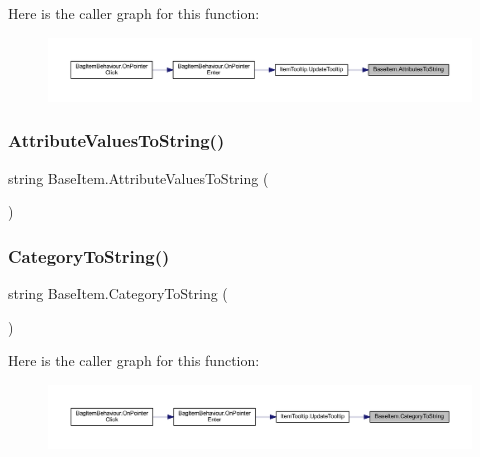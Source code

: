 Here is the caller graph for this function\+:\nopagebreak
\begin{figure}[H]
\begin{center}
\leavevmode
\includegraphics[width=350pt]{class_base_item_afd59d6b5168af724211f54ad3692ea73_icgraph}
\end{center}
\end{figure}
\mbox{\label{class_base_item_a414dcba1b98b9d67f2254b885049bfca}} 
\subsubsection{\texorpdfstring{AttributeValuesToString()}{AttributeValuesToString()}}
{\footnotesize\ttfamily string Base\+Item.\+Attribute\+Values\+To\+String (\begin{DoxyParamCaption}{ }\end{DoxyParamCaption})}

\mbox{\label{class_base_item_ad820521a001d82fc3f52b2483226efde}} 
\subsubsection{\texorpdfstring{CategoryToString()}{CategoryToString()}}
{\footnotesize\ttfamily string Base\+Item.\+Category\+To\+String (\begin{DoxyParamCaption}{ }\end{DoxyParamCaption})}

Here is the caller graph for this function\+:\nopagebreak
\begin{figure}[H]
\begin{center}
\leavevmode
\includegraphics[width=350pt]{class_base_item_ad820521a001d82fc3f52b2483226efde_icgraph}
\end{center}
\end{figure}
\mbox{\label{class_base_item_aa3a6bc4a2af6c424898277764e9c0585}} 
